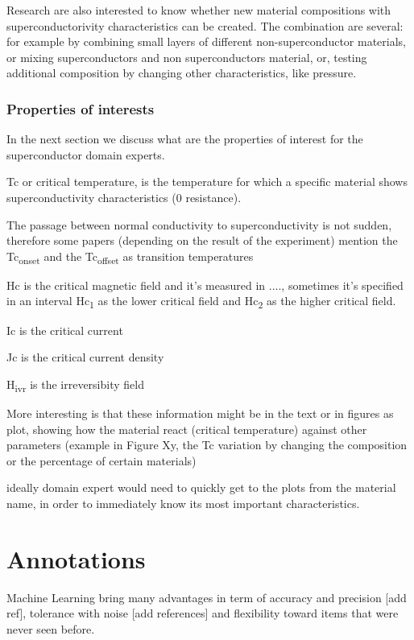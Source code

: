 \documentclass{article}
\begin{document}
Research are also interested to know whether new material compositions with superconductorivity characteristics can be created. The combination are several: for example by combining small layers of different non-superconductor materials, or mixing superconductors and non superconductors material, or, testing additional composition by changing other characteristics, like pressure. 

\subsubsection{Properties of interests}
In the next section we discuss what are the properties of interest for the superconductor domain experts. 

Tc or critical temperature, is the temperature for which a specific material shows superconductivity characteristics (0 resistance). 

The passage between normal conductivity to superconductivity is not sudden, therefore some papers (depending on the result of the experiment) mention the Tc\textsubscript{onset} and the Tc\textsubscript{offset} as transition temperatures

Hc is the critical magnetic field and it's measured in ...., sometimes it's specified in an interval Hc\textsubscript{1} as the lower critical field and Hc\textsubscript{2} as the higher critical field. 

Ic is the critical current

Jc is the critical current density

H\textsubscript{ivr} is the irreversibity field 

More interesting is that these information might be in the text or in figures as plot, showing how the material react (critical temperature) against other parameters (example in Figure Xy, the Tc variation by changing the composition or the percentage of certain materials)


ideally domain expert would need to quickly get to the plots from the material name, in order to immediately know its most important characteristics. 




\section{Annotations}
Machine Learning bring many advantages in term of accuracy and precision [add ref], tolerance with noise [add references] and flexibility toward items that were never seen before. 
\end{document}

